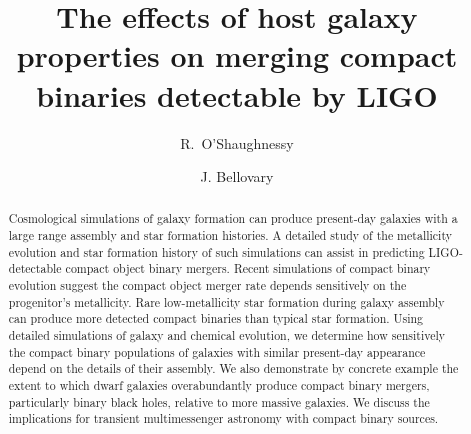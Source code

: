 \documentclass[nofootinbib,twocolumn,prd]{emulateapj}
\newcommand\jillianremark[1]{{\color{blue}#1}}
\begin{document}
\title{The effects of host galaxy properties on merging compact binaries detectable by LIGO}
\author{R.\ O'Shaughnessy}
\author{ J. Bellovary}
\begin{abstract}
Cosmological simulations of galaxy formation can produce present-day galaxies with a large range assembly and star formation histories.  A detailed study of the metallicity evolution and star formation history of such simulations can assist in predicting LIGO-detectable compact object binary mergers.
Recent simulations of compact binary evolution suggest the compact object merger rate depends
sensitively on the progenitor's metallicity.  Rare low-metallicity star formation during galaxy
assembly can produce more detected compact binaries than typical star formation.   
Using detailed simulations of galaxy and chemical evolution, we determine how sensitively the compact binary populations
of galaxies   with similar
present-day appearance depend on the details of their assembly.
%
We also demonstrate by concrete example the extent to which dwarf galaxies overabundantly produce compact binary
mergers, particularly binary black holes, relative to more massive galaxies. 
We discuss the implications for transient multimessenger astronomy with compact binary sources. 

\end{abstract}
\end{document}
